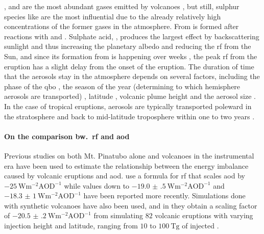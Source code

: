 \documentclass{ametsocV5}
\newcommand{\iso}[1][i]{{#1}njected \ce{SO2}}
\begin{document}
,  and  are the most abundant gases emitted by volcanoes
\citep{robock2000}, but still, sulphur species like  are the most influential
due to the already relatively high concentrations of the former gases in the atmosphere.
From   is formed after reactions with  and 
\citep{robock2000}. Sulphate acid, , produces the largest effect by
backscattering sunlight and thus increasing the planetary albedo and reducing the
\ac{rf} from the Sun, and since its formation from  is happening over weeks
\citep{robock2000}, the peak \ac{rf} from the eruption has a slight delay from the onset
of the eruption. The duration of time that the  aerosols stay in the
atmosphere depends on several factors, including the phase of the \ac{qbo}
\citep{pitari2016b}, the season of the year (determining to which hemisphere aerosols
are transported) \citep{toohey2011,toohey2019}, latitude \citep{marshall2019,
  toohey2019}, volcanic plume height \citep{marshall2019} and the aerosol size
\citep{marshall2019}. In the case of tropical eruptions, aerosols are typically
transported poleward in the stratosphere and back to mid-latitude troposphere within one
to two years \citep{robock2000}.


\paragraph*{On the comparison bw.\ \acs*{rf} and \acs*{aod}}

Previous studies on both Mt. Pinatubo alone \citep{mills2017,hansen2005} and volcanoes
in the instrumental era \citep{gregory2016} have been used to estimate the relationship
between the energy imbalance caused by volcanic eruptions and \ac{aod}.
\citet{myhre2013} use a formula for \ac{rf} that scales \ac{aod} by
\(\SI{-25}{\watt\metre^{-2}\mathrm{AOD}^{-1}}\) while values down to
\(\SI{-19.0(5)}{\watt\metre^{-2}\mathrm{AOD}^{-1}}\) \citep{gregory2016} and
\(\SI{-18.3(10)}{\watt\metre^{-2}\mathrm{AOD}^{-1}}\) \citep{mills2017} have been
reported more recently. Simulations done with synthetic volcanoes have also been used,
and in \citet{marshall2020} they obtain a scaling factor of
\(\SI{-20.5(2)}{\watt\metre^{-2}\mathrm{AOD}^{-1}}\) from simulating \(82\) volcanic
eruptions with varying injection height and latitude, ranging from \(10\) to
\(\SI{100}{\tera\gram}\) of \iso{}.
\end{document}
